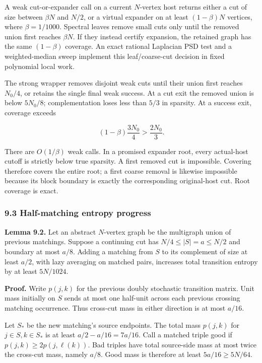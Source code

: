 A weak cut-or-expander call on a current \(N\)-vertex host returns either a cut of size between \(\beta N\) and \(N/2\), or a virtual expander on at least \((1-\beta)N\) vertices, where \(\beta=1/1000\). Spectral leaves remove small cuts only until the removed union first reaches \(\beta N\). If they instead certify expansion, the retained graph has the same \((1-\beta)\) coverage. An exact rational Laplacian PSD test and a weighted-median sweep implement this leaf/coarse-cut decision in fixed polynomial local work.

The strong wrapper removes disjoint weak cuts until their union first reaches \(N_0/4\), or retains the single final weak success. At a cut exit the removed union is below \(5N_0/8\); complementation loses less than \(5/3\) in sparsity. At a success exit, coverage exceeds

\[
(1-\beta)\frac{3N_0}{4}>\frac{2N_0}{3}.
 \tag{37}
\]

There are \(O(1/\beta)\) weak calls. In a promised expander root, every actual-host cutoff is strictly below true sparsity. A first removed cut is impossible. Covering therefore covers the entire root; a first coarse removal is likewise impossible because its block boundary is exactly the corresponding original-host cut. Root coverage is exact.

\hypertarget{af-46593eb93e-half-matching-entropy-progress}{%
\subsubsection{9.3 Half-matching entropy progress}\label{af-46593eb93e-half-matching-entropy-progress}}

\textbf{Lemma 9.2.} Let an abstract \(N\)-vertex graph be the multigraph union of previous matchings. Suppose a continuing cut has \(N/4\leq |S|=a\leq N/2\) and boundary at most \(a/8\). Adding a matching from \(S\) to its complement of size at least \(a/2\), with lazy averaging on matched pairs, increases total transition entropy by at least \(5N/1024\).

\textbf{Proof.} Write \(p(j,k)\) for the previous doubly stochastic transition matrix. Unit mass initially on \(S\) sends at most one half-unit across each previous crossing matching occurrence. Thus cross-cut mass in either direction is at most \(a/16\).

Let \(S_*\) be the new matching's source endpoints. The total mass \(p(j,k)\) for \(j\in S,k\in S_*\) is at least \(a/2-a/16=7a/16\). Call a matched triple good if \(p(j,k)\geq2p(j,\ell(k))\). Bad triples have total source-side mass at most twice the cross-cut mass, namely \(a/8\). Good mass is therefore at least \(5a/16\geq5N/64\).

